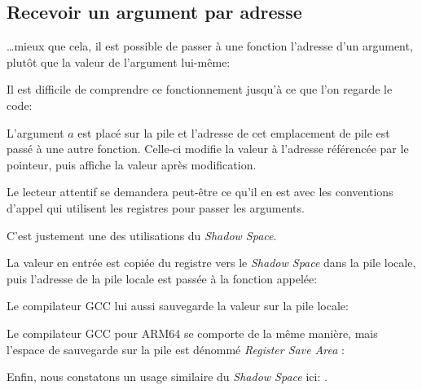 ﻿\subsection{Recevoir un argument par adresse}
\label{pointer_to_argument}

\dots mieux que cela, il est possible de passer à une fonction l'adresse d'un argument, plutôt que
la valeur de l'argument lui-même:



Il est difficile de comprendre ce fonctionnement jusqu'à ce que l'on regarde le code:



L'argument $a$ est placé sur la pile et l'adresse de cet emplacement de pile est passé à une autre
fonction. Celle-ci modifie la valeur à l'adresse référencée par le pointeur, puis \printf affiche
la valeur après modification.

\par Le lecteur attentif se demandera peut-être ce qu'il en est avec les conventions d'appel qui
utilisent les registres pour passer les arguments.

C'est justement une des utilisations du \emph{Shadow Space}.

La valeur en entrée est copiée du registre vers le \emph{Shadow Space} dans la pile locale, puis
l'adresse de la pile locale est passée à la fonction appelée:



Le compilateur GCC lui aussi sauvegarde la valeur sur la pile locale:



Le compilateur GCC pour ARM64 se comporte de la même manière, mais l'espace de sauvegarde sur la pile
est dénommé \emph{Register Save Area} :



Enfin, nous constatons un usage similaire du \emph{Shadow Space} ici: .

